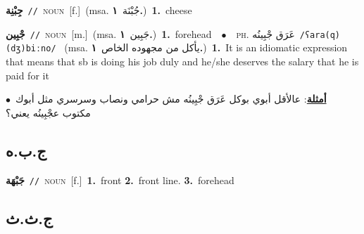 \documentclass[10pt,a4paper,twoside]{article} %
\begin{document}
\begin{multicols}{2}
{\setlength\topsep{0pt}\textbf{\foreignlanguage{arabic}{جِبْنِة}}\ {\color{gray}\texttt{//}\color{black}}\ \textsc{noun}\ [f.]\ \color{gray}(msa. \foreignlanguage{arabic}{جُبْنَة}~\foreignlanguage{arabic}{\textbf{١.}})\color{black}\ \textbf{1.}~cheese\ } \vspace{2mm}

{\setlength\topsep{0pt}\textbf{\foreignlanguage{arabic}{جْبِين}}\ {\color{gray}\texttt{//}\color{black}}\ \textsc{noun}\ [m.]\ \color{gray}(msa. \foreignlanguage{arabic}{جَبِين}~\foreignlanguage{arabic}{\textbf{١.}})\color{black}\ \textbf{1.}~forehead\ \ $\bullet$\ \ \textsc{ph.} \color{gray} \foreignlanguage{arabic}{عَرَق جْبِينُه}\color{black}\ {\color{gray}\texttt{/{\sffamily ʕara(q) (dʒ)biːno}/}\color{black}}\ \color{gray} (msa. \foreignlanguage{arabic}{يأكل من مجهوده الخاص}~\foreignlanguage{arabic}{\textbf{١.}})\color{black}\ \textbf{1.}~It is an idiomatic expression that means that sb is doing his job duly and he/she deserves the salary that he is paid for it\  \begin{flushright}\color{gray}\foreignlanguage{arabic}{\textbf{\underline{\foreignlanguage{arabic}{أمثلة}}}: عالأقل أبوي بوكل عَرَق جْبِينُه مش حرامي ونصاب وسرسري مثل أبوك\ $\bullet$\ \  مكتوب عجْبِينُه يعني؟}\end{flushright}\color{black}} \vspace{2mm}

\vspace{-3mm}
\subsection*{\color{blue}\foreignlanguage{arabic}{ج.ب.ه}\color{blue}{}} 

{\setlength\topsep{0pt}\textbf{\foreignlanguage{arabic}{جَبْهَة}}\ {\color{gray}\texttt{//}\color{black}}\ \textsc{noun}\ [f.]\ \textbf{1.}~front  \textbf{2.}~front line.  \textbf{3.}~forehead\ } \vspace{2mm}

\vspace{-3mm}
\subsection*{\color{blue}\foreignlanguage{arabic}{ج.ث.ث}\color{blue}{}} 


\end{multicols}
\end{document}
